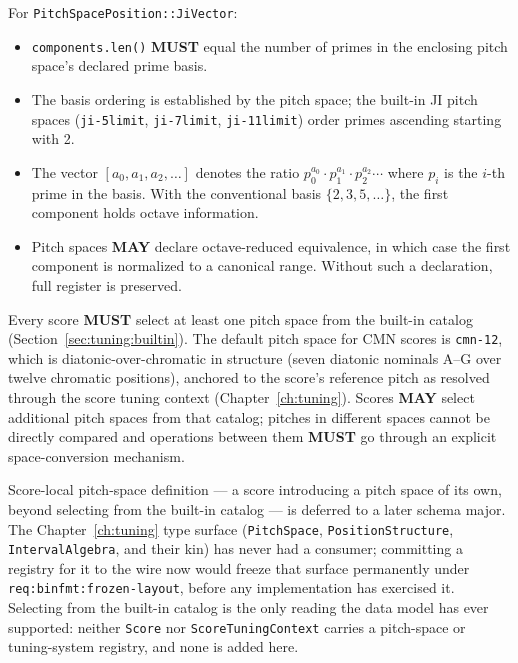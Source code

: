 \documentclass[11pt,letterpaper]{report}
\newcounter{requirement}[chapter]
\newcommand{\MUST}{\textbf{MUST}}
\newcommand{\MAY}{\textbf{MAY}}
\begin{document}
\begin{requirement}
  \label{req:pitch:ji-vector-basis}
  For \texttt{PitchSpacePosition::JiVector}:
  \begin{itemize}
    \item \texttt{components.len()} \MUST{} equal the number of primes
      in the enclosing pitch space's declared prime basis.
    \item The basis ordering is established by the pitch space; the
      built-in JI pitch spaces (\texttt{ji-5limit},
      \texttt{ji-7limit}, \texttt{ji-11limit}) order primes
      ascending starting with 2.
    \item The vector $[a_0, a_1, a_2, \ldots]$ denotes the ratio
      $p_0^{a_0} \cdot p_1^{a_1} \cdot p_2^{a_2} \cdots$ where
      $p_i$ is the $i$-th prime in the basis. With the conventional
      basis $\{2, 3, 5, \ldots\}$, the first component holds
      octave information.
    \item Pitch spaces \MAY{} declare octave-reduced equivalence,
      in which case the first component is normalized to a canonical
      range. Without such a declaration, full register is preserved.
  \end{itemize}
\end{requirement}

\begin{requirement}
  \label{req:pitch:default-pitch-space}
  Every score \MUST{} select at least one pitch space from the
  built-in catalog (Section~\ref{sec:tuning:builtin}). The default
  pitch space for CMN scores is \texttt{cmn-12}, which is
  diatonic-over-chromatic in structure (seven diatonic nominals
  A--G over twelve chromatic positions), anchored to the score's
  reference pitch as resolved through the score tuning context
  (Chapter~\ref{ch:tuning}). Scores \MAY{} select additional pitch
  spaces from that catalog; pitches in different spaces cannot be
  directly compared and operations between them \MUST{} go through an
  explicit space-conversion mechanism.
\end{requirement}

\begin{rationale}
  Score-local pitch-space definition --- a score introducing a pitch
  space of its own, beyond selecting from the built-in catalog --- is
  deferred to a later schema major. The Chapter~\ref{ch:tuning} type
  surface (\texttt{PitchSpace}, \texttt{PositionStructure},
  \texttt{IntervalAlgebra}, and their kin) has never had a consumer;
  committing a registry for it to the wire now would freeze that
  surface permanently under \texttt{req:binfmt:frozen-layout}, before
  any implementation has exercised it. Selecting from the built-in
  catalog is the only reading the data model has ever supported: neither
  \texttt{Score} nor \texttt{ScoreTuningContext} carries a pitch-space
  or tuning-system registry, and none is added here.
\end{rationale}
\end{document}
